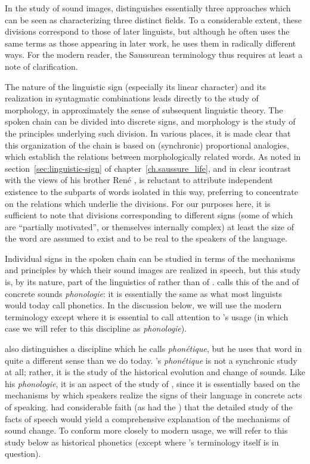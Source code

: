 In the study of sound images, {\Saussure} distinguishes essentially three
ap\-proaches which can be seen as characterizing three distinct
fields. To a considerable extent, these divisions correspond to those
of later linguists, but although he often uses the same terms as those
appearing in later work, he uses them in radically different ways. For
the modern reader, the Saussurean terminology thus requires at least a
note of clarification.

The nature of the linguistic sign (especially its linear character)
and its realization in syntagmatic combinations leads directly to the
study of morphology, in approximately the sense of subsequent
linguistic theory. The spoken chain can be divided into discrete
signs, and morphology is the study of the principles underlying such
division. In various places, it is made clear that this organization
of the chain is based on (synchronic) proportional analogies, which
establish the relations between morphologically related words. As
noted in section~\ref{sec:linguistic-sign} of
chapter~\ref{ch.saussure_life}, and in clear i{contrast} with the views
of his brother René \citep{sra18:f.vs.r.saussure}, {\Saussure} is
reluctant to attribute independent existence to the subparts of words
isolated in this way, preferring to concentrate on the relations which
underlie the divisions. For our purposes here, it is sufficient to
note that divisions corresponding to different signs (some of which
are ``partially motivated'', or themselves internally complex) at
least the size of the word are assumed to exist and to be real to the
speakers of the language.

Individual signs in the spoken chain can be studied in terms of the
mechanisms and principles by which their sound images are realized in
speech, but this study is, by its nature, part of the linguistics of
\emph{} rather than of \emph{}. {\Saussure} calls this
 of the  and  of concrete sounds
\emph{phonologie}: it is essentially the same as what most linguists
would today call phonetics. In the discussion below, we will use the
modern terminology except where it is essential to call attention to
{\Saussure}'s usage (in which case we will refer to this discipline as
\emph{phonologie}).

{\Saussure} also distinguishes a discipline which he calls
\emph{phonétique}, but he uses that word in quite a different sense
than we do today. {\Saussure}'s \emph{phonétique} is not a synchronic
study at all; rather, it is the study of the historical evolution and
change of sounds. Like his \emph{phonologie}, it is an aspect of the
study of \emph{}, since it is essentially based on the
mechanisms by which speakers realize the signs of their language in
concrete acts of speaking. {\Saussure} had considerable faith (as had the
) that the detailed study of the facts of speech would
yield a comprehensive {explanation} of the mechanisms of sound
change. To conform more closely to modern usage, we will refer to this
study below as historical phonetics (except where {\Saussure}'s
terminology itself is in question).

